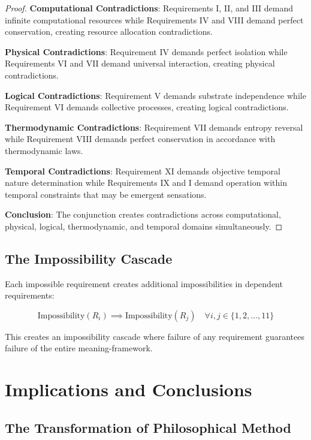 \documentclass[12pt,a4paper]{article}
\begin{document}
\begin{proof}
\textbf{Computational Contradictions}: Requirements I, II, and III demand infinite computational resources while Requirements IV and VIII demand perfect conservation, creating resource allocation contradictions.

\textbf{Physical Contradictions}: Requirement IV demands perfect isolation while Requirements VI and VII demand universal interaction, creating physical contradictions.

\textbf{Logical Contradictions}: Requirement V demands substrate independence while Requirement VI demands collective processes, creating logical contradictions.

\textbf{Thermodynamic Contradictions}: Requirement VII demands entropy reversal while Requirement VIII demands perfect conservation in accordance with thermodynamic laws.

\textbf{Temporal Contradictions}: Requirement XI demands objective temporal nature determination while Requirements IX and I demand operation within temporal constraints that may be emergent sensations.

\textbf{Conclusion}: The conjunction creates contradictions across computational, physical, logical, thermodynamic, and temporal domains simultaneously.
\end{proof}

\subsection{The Impossibility Cascade}

Each impossible requirement creates additional impossibilities in dependent requirements:

$$\text{Impossibility}(R_i) \implies \text{Impossibility}(R_j) \quad \forall i,j \in \{1,2,\ldots,11\}$$

This creates an impossibility cascade where failure of any requirement guarantees failure of the entire meaning-framework.

\section{Implications and Conclusions}

\subsection{The Transformation of Philosophical Method}
\end{document}
